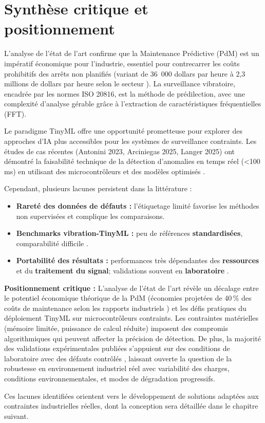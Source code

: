 \section{Synthèse critique et positionnement}
\label{sec:synthese_critique}

L'analyse de l'état de l'art confirme que la Maintenance Prédictive (PdM) est un impératif économique pour l'industrie, essentiel pour contrecarrer les coûts prohibitifs des arrêts non planifiés (variant de 36~000 dollars par heure à 2,3 millions de dollars par heure selon le secteur \cite{siemens2024}). La surveillance vibratoire, encadrée par les normes ISO 20816, est la méthode de prédilection, avec une complexité d'analyse gérable grâce à l'extraction de caractéristiques fréquentielles (FFT).

Le paradigme TinyML offre une opportunité prometteuse pour explorer des approches d'IA plus accessibles pour les systèmes de surveillance contraints. Les études de cas récentes (Antonini 2023, Arciniegas 2025, Langer 2025) ont démontré la faisabilité technique de la détection d'anomalies en temps réel (<100\,ms) en utilisant des microcontrôleurs et des modèles optimisés \cite{antonini2023,arciniegas2025,langer2025}.

Cependant, plusieurs lacunes persistent dans la littérature :

\begin{itemize}
\item \textbf{Rareté des données de défauts :} l'étiquetage limité favorise les méthodes non supervisées et complique les comparaisons.
\item \textbf{Benchmarks vibration-TinyML :} peu de références \textbf{standardisées}, comparabilité difficile \cite{banbury2021}.
\item \textbf{Portabilité des résultats :} performances très dépendantes des \textbf{ressources} et du \textbf{traitement du signal}; validations souvent en \textbf{laboratoire} \cite{antonini2023,arciniegas2025,langer2025}.
\end{itemize}

\textbf{Positionnement critique :} L'analyse de l'état de l'art révèle un décalage entre le potentiel économique théorique de la PdM (économies projetées de 40\,\% des coûts de maintenance selon les rapports industriels \cite{siemens2024}) et les défis pratiques du déploiement TinyML sur microcontrôleurs contraints. Les contraintes matérielles (mémoire limitée, puissance de calcul réduite) imposent des compromis algorithmiques qui peuvent affecter la précision de détection. De plus, la majorité des validations expérimentales publiées s'appuient sur des conditions de laboratoire avec des défauts contrôlés \cite{antonini2023,arciniegas2025,langer2025}, laissant ouverte la question de la robustesse en environnement industriel réel avec variabilité des charges, conditions environnementales, et modes de dégradation progressifs.

Ces lacunes identifiées orientent vers le développement de solutions adaptées aux contraintes industrielles réelles, dont la conception sera détaillée dans le chapitre suivant.